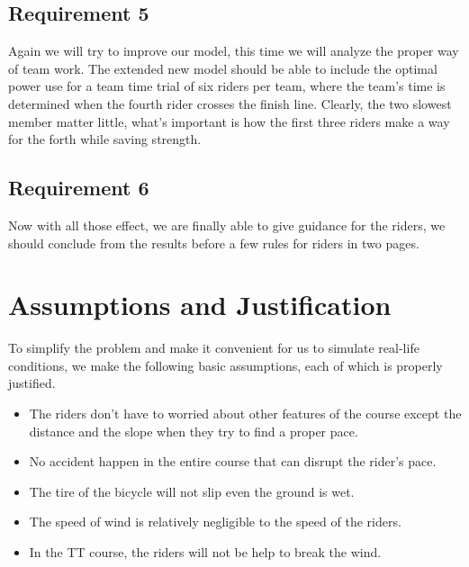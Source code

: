 \documentclass[12pt]{article}
\begin{document}
\subsection{Requirement 5}
Again we will try to improve our model, this time we will analyze the proper way of team work. The extended new model should be able to  include the optimal power use for a team time trial of six riders per team, where the team's time is 
determined when the fourth rider crosses the finish line. Clearly, the two slowest member matter little, what's important is how the first three riders make a way for the forth while saving strength.
\subsection{Requirement 6}
Now with all those effect, we are finally able to give guidance for the riders, we should conclude from the results before a few rules for riders in two pages. 
\section{Assumptions and Justification}

To simplify the problem and make it convenient for us to simulate real-life conditions, we make the following basic assumptions, each of which is properly justified.

\begin{itemize}
    \item The riders don't have to worried about other features of the course except the distance and the slope when they try to find a proper pace.
    \item No accident happen in the entire course that can disrupt the rider's pace.
    \item The tire of the bicycle will not slip even the ground is wet.
    \item The speed of wind is relatively negligible to the speed of the riders.
    \item In the TT course, the riders will not be help to break the wind.

\end{itemize}
\end{document}
